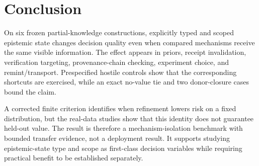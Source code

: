 \section{Conclusion}

On six frozen partial-knowledge constructions, explicitly typed and scoped epistemic state changes decision quality even when compared mechanisms receive the same visible information. The effect appears in priors, receipt invalidation, verification targeting, provenance-chain checking, experiment choice, and remint/transport. Prespecified hostile controls show that the corresponding shortcuts are exercised, while an exact no-value tie and two donor-closure cases bound the claim.

A corrected finite criterion identifies when refinement lowers risk on a fixed distribution, but the real-data studies show that this identity does not guarantee held-out value. The result is therefore a mechanism-isolation benchmark with bounded transfer evidence, not a deployment result. It supports studying epistemic-state type and scope as first-class decision variables while requiring practical benefit to be established separately.
